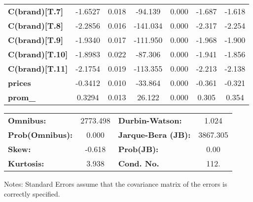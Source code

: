 \begin{center}
\begin{tabular}{lcccccc}
\textbf{C(brand)[T.7]}  &      -1.6527  &        0.018     &   -94.139  &         0.000        &       -1.687    &       -1.618     \\
\textbf{C(brand)[T.8]}  &      -2.2856  &        0.016     &  -141.034  &         0.000        &       -2.317    &       -2.254     \\
\textbf{C(brand)[T.9]}  &      -1.9340  &        0.017     &  -111.950  &         0.000        &       -1.968    &       -1.900     \\
\textbf{C(brand)[T.10]} &      -1.8983  &        0.022     &   -87.306  &         0.000        &       -1.941    &       -1.856     \\
\textbf{C(brand)[T.11]} &      -2.1754  &        0.019     &  -113.355  &         0.000        &       -2.213    &       -2.138     \\
\textbf{prices}         &      -0.3412  &        0.010     &   -33.864  &         0.000        &       -0.361    &       -0.321     \\
\textbf{prom\_}         &       0.3294  &        0.013     &    26.122  &         0.000        &        0.305    &        0.354     \\
\bottomrule
\end{tabular}
\begin{tabular}{lclc}
\textbf{Omnibus:}       & 2773.498 & \textbf{  Durbin-Watson:     } &    1.024  \\
\textbf{Prob(Omnibus):} &   0.000  & \textbf{  Jarque-Bera (JB):  } & 3867.305  \\
\textbf{Skew:}          &  -0.618  & \textbf{  Prob(JB):          } &     0.00  \\
\textbf{Kurtosis:}      &   3.938  & \textbf{  Cond. No.          } &     112.  \\
\bottomrule
\end{tabular}
\end{center}

Notes: \newline
 [1] Standard Errors assume that the covariance matrix of the errors is correctly specified.
